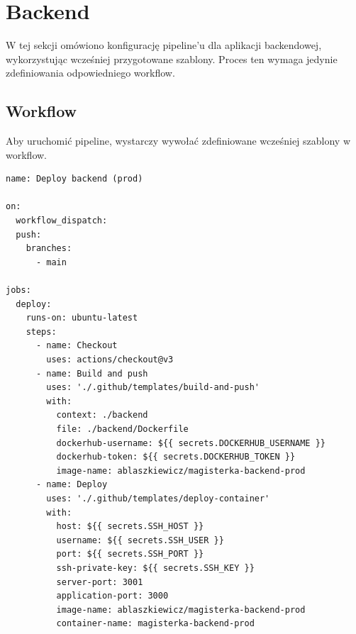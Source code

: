 \documentclass{article}
\begin{document}
\section{Backend}

W tej sekcji omówiono konfigurację pipeline’u dla aplikacji backendowej, wykorzystując wcześniej przygotowane szablony. Proces ten wymaga jedynie zdefiniowania odpowiedniego workflow.


\subsection{Workflow}

Aby uruchomić pipeline, wystarczy wywołać zdefiniowane wcześniej szablony w workflow. 

\begin{lstlisting}[caption=Plik \texttt{.github/workflows/prod-deploy-backend.yml}]
name: Deploy backend (prod)

on:
  workflow_dispatch:
  push:
    branches:
      - main

jobs:
  deploy:
    runs-on: ubuntu-latest
    steps:
      - name: Checkout
        uses: actions/checkout@v3
      - name: Build and push
        uses: './.github/templates/build-and-push'
        with:
          context: ./backend
          file: ./backend/Dockerfile
          dockerhub-username: ${{ secrets.DOCKERHUB_USERNAME }}
          dockerhub-token: ${{ secrets.DOCKERHUB_TOKEN }}
          image-name: ablaszkiewicz/magisterka-backend-prod
      - name: Deploy
        uses: './.github/templates/deploy-container'
        with:
          host: ${{ secrets.SSH_HOST }}
          username: ${{ secrets.SSH_USER }}
          port: ${{ secrets.SSH_PORT }}
          ssh-private-key: ${{ secrets.SSH_KEY }}
          server-port: 3001
          application-port: 3000
          image-name: ablaszkiewicz/magisterka-backend-prod
          container-name: magisterka-backend-prod

\end{lstlisting}
\end{document}

